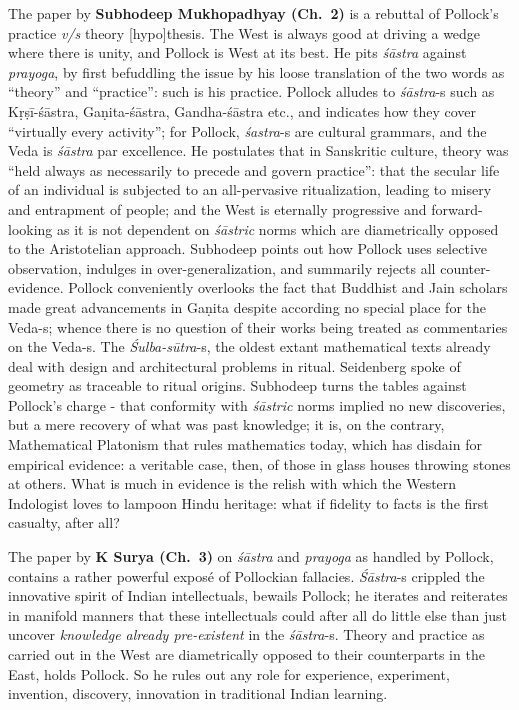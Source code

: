 The paper by {\bf Subhodeep Mukhopadhyay (Ch.~2)} is a rebuttal of Pollock’s practice {\sl v/s} theory [hypo]thesis. The West is always good at driving a wedge where there is unity, and Pollock is West at its best. He pits {\sl śāstra} against  {\sl prayoga}, by first befuddling the issue by his loose translation of the two words as “theory” and “practice”: such is his practice. Pollock alludes to {\sl śāstra}-s such as Kṛṣī-śāstra, Gaṇita-śāstra, Gandha-śāstra etc., and indicates how they cover “virtually every activity”; for Pollock, {\sl śastra}-s are cultural grammars, and the Veda is {\sl śāstra} par excellence. He postulates that in Sanskritic culture, theory was “held always as necessarily to precede and govern practice'': that the secular life of an individual is subjected to an all-pervasive ritualization, leading to misery and entrapment of people; and the West is eternally progressive and forward-looking as it is not dependent on {\sl śāstric} norms which are diametrically opposed to the Aristotelian approach. Subhodeep points out how Pollock uses selective observation, indulges in over-generalization, and summarily rejects all counter-evidence. Pollock conveniently overlooks the fact that Buddhist and Jain scholars made great advancements in Gaṇita despite according no special place for the Veda-s; whence there is no question of their works being treated as commentaries on the \hbox{Veda-s}. The {\sl Śulba-sūtra}-s, the oldest extant mathematical texts already deal with design and architectural problems in ritual. Seidenberg spoke of geometry as traceable to ritual origins. Subhodeep turns the tables against Pollock’s charge - that conformity with {\sl śāstric} norms implied no new discoveries, but a mere recovery of what was past knowledge; it is, on the contrary, Mathematical Platonism that rules mathematics today, which has disdain for empirical evidence: a veritable case, then, of those in glass houses throwing stones at others. What is much in evidence is the relish with which the Western Indologist loves to lampoon Hindu heritage: what if fidelity to facts is the first casualty, after all?
\vskip 8pt

The paper by {\bf K Surya (Ch.~3)} on {\sl śāstra} and {\sl prayoga} as handled by Pollock, contains a rather powerful exposé of Pollockian fallacies. {\sl Śāstra}-s crippled the innovative spirit of Indian intellectuals, bewails Pollock; he iterates and reiterates in manifold manners that these intellectuals could after all do little else than just uncover {\sl knowledge already pre-existent} in the {\sl śāstra}-s. Theory and practice as carried out in the West are diametrically opposed to their counterparts in the East, holds Pollock. So he rules out any role for experience, experiment, invention, discovery, innovation in traditional Indian learning.
\vskip 3pt

